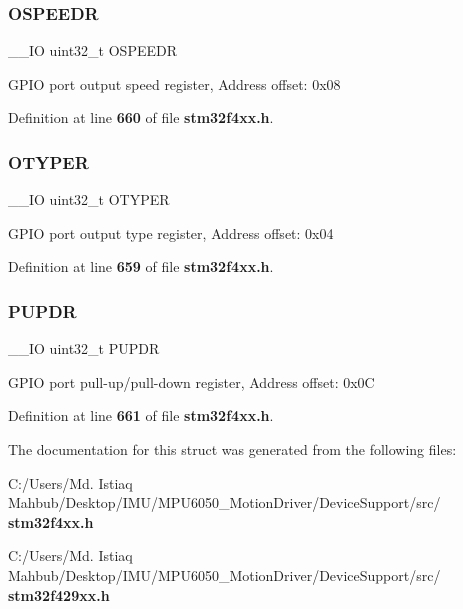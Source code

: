 \subsubsection{O\+S\+P\+E\+E\+DR}
{\footnotesize\ttfamily \+\_\+\+\_\+\+IO uint32\+\_\+t O\+S\+P\+E\+E\+DR}

G\+P\+IO port output speed register, Address offset\+: 0x08 

Definition at line \textbf{ 660} of file \textbf{ stm32f4xx.\+h}.

\mbox{\label{structGPIO__TypeDef_a9543592bda60cb5261075594bdeedac9}} 
\subsubsection{O\+T\+Y\+P\+ER}
{\footnotesize\ttfamily \+\_\+\+\_\+\+IO uint32\+\_\+t O\+T\+Y\+P\+ER}

G\+P\+IO port output type register, Address offset\+: 0x04 

Definition at line \textbf{ 659} of file \textbf{ stm32f4xx.\+h}.

\mbox{\label{structGPIO__TypeDef_abeed38529bd7b8de082e490e5d4f1727}} 
\subsubsection{P\+U\+P\+DR}
{\footnotesize\ttfamily \+\_\+\+\_\+\+IO uint32\+\_\+t P\+U\+P\+DR}

G\+P\+IO port pull-\/up/pull-\/down register, Address offset\+: 0x0C 

Definition at line \textbf{ 661} of file \textbf{ stm32f4xx.\+h}.



The documentation for this struct was generated from the following files\+:\begin{DoxyCompactItemize}
\item 
C\+:/\+Users/\+Md. Istiaq Mahbub/\+Desktop/\+I\+M\+U/\+M\+P\+U6050\+\_\+\+Motion\+Driver/\+Device\+Support/src/\textbf{ stm32f4xx.\+h}\item 
C\+:/\+Users/\+Md. Istiaq Mahbub/\+Desktop/\+I\+M\+U/\+M\+P\+U6050\+\_\+\+Motion\+Driver/\+Device\+Support/src/\textbf{ stm32f429xx.\+h}\end{DoxyCompactItemize}
